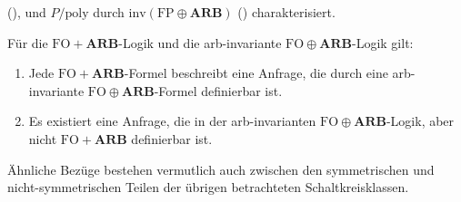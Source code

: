 (\cite{Immerman1987,Makowsky1997-FO}), und $P/\mathrm{poly}$ durch
$\mathrm{inv}\left(\mathrm{FP}\oplus\mathbf{ARB}\right)$ (\cite{Makowsky1997-FO,Makowsky1998-LFP})
charakterisiert.
\begin{thm}
\label{thm:fo-arb}Für die $\mathrm{FO}+\mathbf{ARB}$-Logik und die
arb-invariante $\mathrm{FO}\oplus\mathbf{ARB}$-Logik gilt:

\begin{enumerate}
\item Jede $\mathrm{FO}+\mathbf{ARB}$-Formel beschreibt eine Anfrage, die
durch eine arb-invariante $\mathrm{FO}\oplus\mathbf{ARB}$-Formel
definierbar ist.
\item Es existiert eine Anfrage, die in der arb-invarianten $\mathrm{FO}\oplus\mathbf{ARB}$-Logik,
aber nicht $\mathrm{FO}+\mathbf{ARB}$ definierbar ist.
\end{enumerate}
\end{thm}
Ähnliche Bezüge bestehen vermutlich auch zwischen den symmetrischen
und nicht-symmetrischen Teilen der übrigen betrachteten Schaltkreisklassen.
